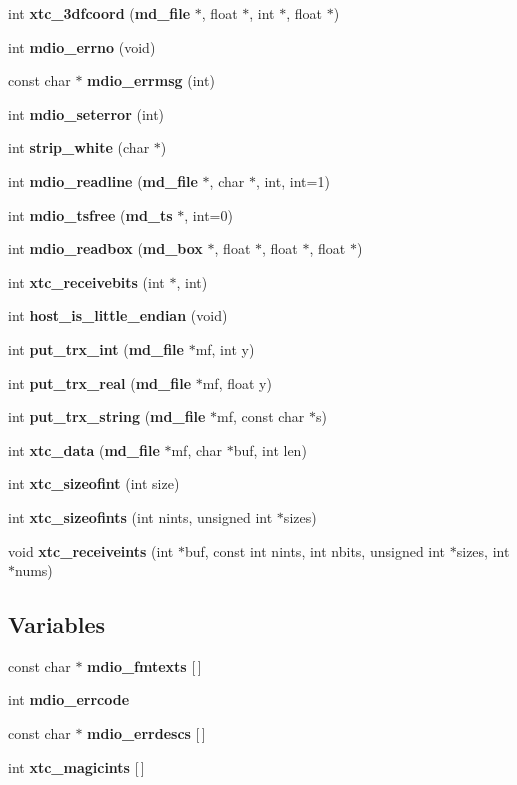 \begin{CompactItemize}
\item 
int {\bf xtc\_\-3dfcoord} ({\bf md\_\-file} $\ast$, float $\ast$, int $\ast$, float $\ast$)
\item 
int {\bf mdio\_\-errno} (void)
\item 
const char $\ast$ {\bf mdio\_\-errmsg} (int)
\item 
int {\bf mdio\_\-seterror} (int)
\item 
int {\bf strip\_\-white} (char $\ast$)
\item 
int {\bf mdio\_\-readline} ({\bf md\_\-file} $\ast$, char $\ast$, int, int=1)
\item 
int {\bf mdio\_\-tsfree} ({\bf md\_\-ts} $\ast$, int=0)
\item 
int {\bf mdio\_\-readbox} ({\bf md\_\-box} $\ast$, float $\ast$, float $\ast$, float $\ast$)
\item 
int {\bf xtc\_\-receivebits} (int $\ast$, int)
\item 
int {\bf host\_\-is\_\-little\_\-endian} (void)
\item 
int {\bf put\_\-trx\_\-int} ({\bf md\_\-file} $\ast$mf, int y)
\item 
int {\bf put\_\-trx\_\-real} ({\bf md\_\-file} $\ast$mf, float y)
\item 
int {\bf put\_\-trx\_\-string} ({\bf md\_\-file} $\ast$mf, const char $\ast$s)
\item 
int {\bf xtc\_\-data} ({\bf md\_\-file} $\ast$mf, char $\ast$buf, int len)
\item 
int {\bf xtc\_\-sizeofint} (int size)
\item 
int {\bf xtc\_\-sizeofints} (int nints, unsigned int $\ast$sizes)
\item 
void {\bf xtc\_\-receiveints} (int $\ast$buf, const int nints, int nbits, unsigned int $\ast$sizes, int $\ast$nums)
\end{CompactItemize}
\subsection*{Variables}
\begin{CompactItemize}
\item 
const char $\ast$ {\bf mdio\_\-fmtexts} [$\,$]
\item 
int {\bf mdio\_\-errcode}
\item 
const char $\ast$ {\bf mdio\_\-errdescs} [$\,$]
\item 
int {\bf xtc\_\-magicints} [$\,$]
\end{CompactItemize}


